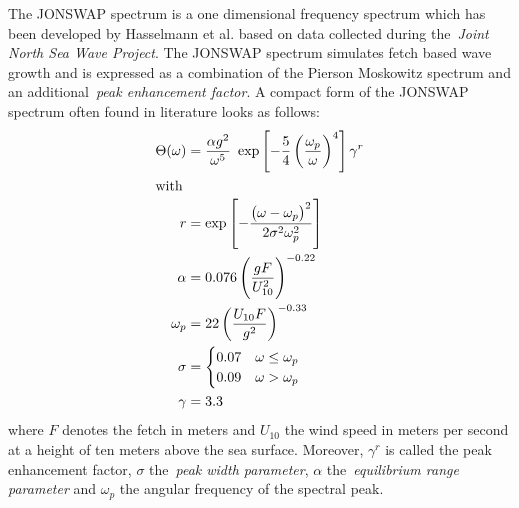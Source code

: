%
The JONSWAP spectrum is a one dimensional frequency spectrum  which has been 
developed by Hasselmann et al.\cite{article:Hasselman1973} based on data 
collected during the~\emph{Joint North Sea Wave Project}. The JONSWAP spectrum 
simulates fetch based wave growth and is expressed as a combination of the 
Pierson Moskowitz spectrum and an additional~\emph{peak enhancement factor}. A 
compact form of the JONSWAP spectrum often found in literature looks as follows:
%
\begin{subequations}
\label{eq:jonswap_omega}
\begin{align}
 \Theta(\omega) &= \frac{\alpha
g^2}{\omega^5}~\exp\left[-\frac{5}{4}\left(\frac{\omega_p}{\omega}
\right)^4\right]\gamma^r\\
\intertext{with}
r& = \exp\left[-\frac{\left(\omega -
\omega_p\right)^2}{2\sigma^2\omega_p^2}\right] \\
\alpha &= 0.076\left(\frac{gF}{U_{10}^2}\right)^{-0.22} \\
\omega_{p} &= 22\left(\frac{U_{10}F}{g^2}\right)^{-0.33} \\
\sigma &= \begin{cases}
	0.07 & \omega\leq\omega_p\\
	0.09 & \omega > \omega_p
    \end{cases} \\
\gamma &= 3.3
\end{align}
\end{subequations}
where $F$ denotes the fetch in meters and $U_{10}$ the wind speed in meters per 
second at a height of ten meters above the sea surface. Moreover, $\gamma^r$ is 
called the peak enhancement factor, $\sigma$ the~\emph{peak width parameter}, 
$\alpha$ the~\emph{equilibrium range parameter} and $\omega_p$ the angular 
frequency of the spectral peak.
%
